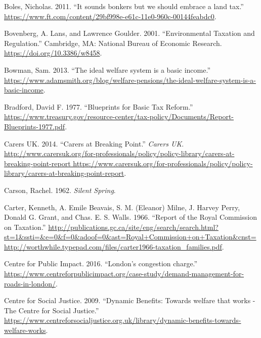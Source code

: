 \documentclass[]{tufte-handout}
\begin{document}
\leavevmode\hypertarget{ref-Boles}{}%
Boles, Nicholas. 2011. ``It sounds bonkers but we should embrace a land
tax.''
\url{https://www.ft.com/content/29bf998e-e61c-11e0-960c-00144feabdc0}.

\leavevmode\hypertarget{ref-Bovenberg2001}{}%
Bovenberg, A. Lans, and Lawrence Goulder. 2001. ``Environmental Taxation
and Regulation.'' Cambridge, MA: National Bureau of Economic Research.
\url{https://doi.org/10.3386/w8458}.

\leavevmode\hypertarget{ref-SamBowman2013}{}%
Bowman, Sam. 2013. ``The ideal welfare system is a basic income.''
\url{https://www.adamsmith.org/blog/welfare-pensions/the-ideal-welfare-system-is-a-basic-income}.

\leavevmode\hypertarget{ref-Bradford1977}{}%
Bradford, David F. 1977. ``Blueprints for Basic Tax Reform.''
\url{https://www.treasury.gov/resource-center/tax-policy/Documents/Report-Blueprints-1977.pdf}.

\leavevmode\hypertarget{ref-CarersUK2014}{}%
Carers UK. 2014. ``Carers at Breaking Point.'' \emph{Carers UK}.
\href{http://www.carersuk.org/for-professionals/policy/policy-library/carers-at-breaking-point-report\%20https://www.carersuk.org/for-professionals/policy/policy-library/carers-at-breaking-point-report}{http://www.carersuk.org/for-professionals/policy/policy-library/carers-at-breaking-point-report https://www.carersuk.org/for-professionals/policy/policy-library/carers-at-breaking-point-report}.

\leavevmode\hypertarget{ref-Carson1962}{}%
Carson, Rachel. 1962. \emph{Silent Spring}.

\leavevmode\hypertarget{ref-Carter1966}{}%
Carter, Kenneth, A. Emile Beavais, S. M. (Eleanor) Milne, J. Harvey
Perry, Donald G. Grant, and Chas. E. S. Walls. 1966. ``Report of the
Royal Commission on Taxation.''
\href{http://publications.gc.ca/site/eng/search/search.html?st=1\&ssti=\&e=0\&f=0\&adoof=0\&ast=Royal+Commission+on+Taxation\&cnst=\%20http://worthwhile.typepad.com/files/carter1966-taxation_families.pdf}{http://publications.gc.ca/site/eng/search/search.html?st=1\&ssti=\&e=0\&f=0\&adoof=0\&ast=Royal+Commission+on+Taxation\&cnst= http://worthwhile.typepad.com/files/carter1966-taxation\_families.pdf}.

\leavevmode\hypertarget{ref-CentreforPublicImpact2016}{}%
Centre for Public Impact. 2016. ``London's congestion charge.''
\url{https://www.centreforpublicimpact.org/case-study/demand-management-for-roads-in-london/}.

\leavevmode\hypertarget{ref-CentreforSocialJustice2009}{}%
Centre for Social Justice. 2009. ``Dynamic Benefits: Towards welfare
that works - The Centre for Social Justice.''
\url{https://www.centreforsocialjustice.org.uk/library/dynamic-benefits-towards-welfare-works}.
\end{document}
